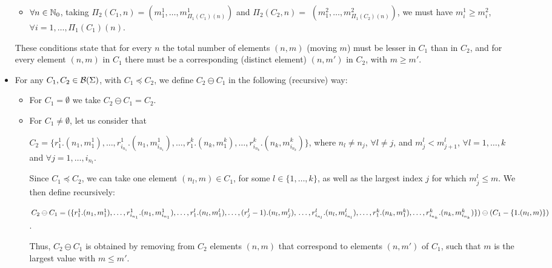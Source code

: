 \begin{definition}
\begin{itemize}
\begin{itemize}
  \item \mbox{$\forall n \in \mathbb{N}_{0}$}, taking \mbox{$\Pi_2(C_1,n) = (m^1_1,\ldots,
        m^1_{\Pi_1(C_1)(n)})$} and
        \mbox{$\Pi_2(C_2,n) = $} \linebreak
        $(m^2_1,\ldots,m^2_{\Pi_1(C_2)(n)})$,
        we must have  $m^1_i \geq m^2_i$, $\forall i=1,\ldots,
        \Pi_1(C_1)(n)$.
  \end{itemize}
%
%  
These conditions state that for every $n$ the total number of
elements $(n,m)$ (moving $m$) must be lesser in $C_1$ than in $C_2$, and 
for every element $(n,m)$ in $C_1$ there must be a 
corresponding (distinct element) $(n,m')$ in $C_2$, with $m\geq m'$.
%
\item For any $C_1,C_2 \in {\cal B}(\Sigma)$, with $C_1 \preceq C_2$,
we define $C_2 \ominus C_1$ in the following (recursive) way: 
  \begin{itemize}
  \item For $C_1 = \emptyset$ we take $C_2 \ominus C_1 = C_2$.
  \item For $C_1 \neq \emptyset$, let us consider that 

        \noindent $C_2 = \{ r^1_1.(n_1,m^1_1), \ldots,
         r^1_{i_{n_{1}}}.(n_1,m^1_{i_{n_{1}}}),
        \ldots, r^k_1.(n_k,m^k_1),\ldots, r^k_{i_{n_{k}}}.(n_k,m^k_{i_{n_{k}}}) \}$,
        where $n_l \neq n_j$, $\forall l \neq j$, and
        $m^l_j < m^l_{j+1}$, $\forall l=1,\ldots,k$ and $\forall
        j=1,\ldots,i_{n_{l}}$.

        Since $C_1 \preceq C_2$, we can take one element $(n_l,m) \in C_1$, 
        for some $l\in \{1,\ldots,k\}$, as well as the largest index $j$
        for which $m^l_{j} \leq m$. We then define recursively:
       
        \noindent $C_2 \ominus C_1 = %
        (
        \{ r^1_1.(n_1,m^1_1), \ldots, r^1_{i_{n_{1}}}.(n_1,m^1_{i_{n_{1}}}),
        \ldots,
        r^l_1.(n_l,m^l_1), \ldots,(r^l_{j} - 1).(n_l,m^l_j),\\
        \ldots,
        r^l_{i_{n_{l}}}.(n_l,m^l_{i_{n_{l}}}), 
        \ldots, r^k_1.(n_k,m^k_1),\ldots, r^k_{i_{n_{k}}}.(n_k,m^k_{i_{n_{k}}}) \}
        ) 
        \ominus (C_1 - \{ 1.(n_l,m) \})
        $.

        Thus, $C_2 \ominus C_1$ is obtained by removing from $C_2$ 
        elements $(n,m)$ that correspond to elements $(n,m')$ of $C_1$,
        such that $m$ is the largest value with $m\leq m'$.


\end{itemize}
\end{itemize}
\end{definition}

